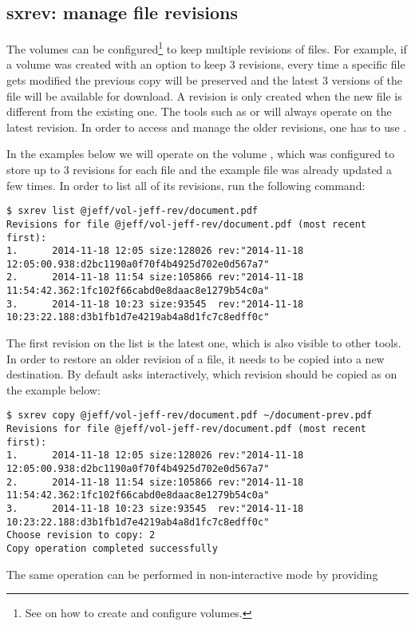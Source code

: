 \subsection{sxrev: manage file revisions}
The \SX volumes can be configured\footnote{See  on how
to create and configure volumes.} to keep multiple revisions of files. For
example, if a volume was created with an option to keep 3 revisions, every
time a specific file gets modified the previous copy will be preserved and
the latest 3 versions of the file will be available for download. A revision
is only created when the new file is different from the existing one.
The tools such as  or  will always operate on the latest
revision.  In order to access and manage the older revisions, one has to
use .

In the examples below we will operate on the volume , which
was configured to store up to 3 revisions for each file and the example file
 was already updated a few times. In order to list all of
its revisions, run the following command:
\begin{lstlisting}
$ sxrev list @jeff/vol-jeff-rev/document.pdf
Revisions for file @jeff/vol-jeff-rev/document.pdf (most recent first):
1.      2014-11-18 12:05 size:128026 rev:"2014-11-18 12:05:00.938:d2bc1190a0f70f4b4925d702e0d567a7"
2.      2014-11-18 11:54 size:105866 rev:"2014-11-18 11:54:42.362:1fc102f66cabd0e8daac8e1279b54c0a"
3.      2014-11-18 10:23 size:93545  rev:"2014-11-18 10:23:22.188:d3b1fb1d7e4219ab4a8d1fc7c8edff0c"
\end{lstlisting}
The first revision on the list is the latest one, which is also visible to
other tools. In order to restore an older revision of a file, it needs to
be copied into a new destination. By default  asks interactively,
which revision should be copied as on the example below:
\begin{lstlisting}
$ sxrev copy @jeff/vol-jeff-rev/document.pdf ~/document-prev.pdf
Revisions for file @jeff/vol-jeff-rev/document.pdf (most recent first):
1.      2014-11-18 12:05 size:128026 rev:"2014-11-18 12:05:00.938:d2bc1190a0f70f4b4925d702e0d567a7"
2.      2014-11-18 11:54 size:105866 rev:"2014-11-18 11:54:42.362:1fc102f66cabd0e8daac8e1279b54c0a"
3.      2014-11-18 10:23 size:93545  rev:"2014-11-18 10:23:22.188:d3b1fb1d7e4219ab4a8d1fc7c8edff0c"
Choose revision to copy: 2
Copy operation completed successfully
\end{lstlisting}
The same operation can be performed in non-interactive mode by providing
